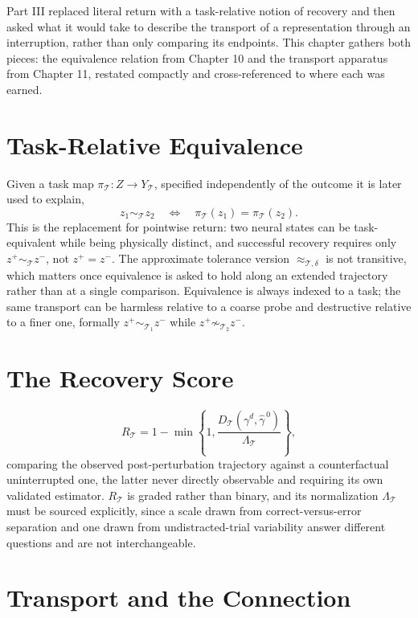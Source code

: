 \documentclass[11pt]{book}
\begin{document}
Part III replaced literal return with a task-relative notion of recovery and then asked what it would take to describe the transport of a representation through an interruption, rather than only comparing its endpoints. This chapter gathers both pieces: the equivalence relation from Chapter 10 and the transport apparatus from Chapter 11, restated compactly and cross-referenced to where each was earned.

\section*{Task-Relative Equivalence}

Given a task map $\pi_{\mathcal T}:Z\to Y_{\mathcal T}$, specified independently of the outcome it is later used to explain,
\[
z_1\sim_{\mathcal T}z_2
\quad\Longleftrightarrow\quad
\pi_{\mathcal T}(z_1)=\pi_{\mathcal T}(z_2).
\]
This is the replacement for pointwise return: two neural states can be task-equivalent while being physically distinct, and successful recovery requires only $z^{+}\sim_{\mathcal T}z^{-}$, not $z^{+}=z^{-}$. The approximate tolerance version $\approx_{\mathcal T,\delta}$ is not transitive, which matters once equivalence is asked to hold along an extended trajectory rather than at a single comparison. Equivalence is always indexed to a task; the same transport can be harmless relative to a coarse probe and destructive relative to a finer one, formally $z^{+}\sim_{\mathcal T_1}z^{-}$ while $z^{+}\not\sim_{\mathcal T_2}z^{-}$.

\section*{The Recovery Score}

\[
R_{\mathcal T}
=1-\min\left\{1,\frac{D_{\mathcal T}(\gamma^{d},\widehat\gamma^{\,0})}{\Lambda_{\mathcal T}}\right\},
\]
comparing the observed post-perturbation trajectory against a counterfactual uninterrupted one, the latter never directly observable and requiring its own validated estimator. $R_{\mathcal T}$ is graded rather than binary, and its normalization $\Lambda_{\mathcal T}$ must be sourced explicitly, since a scale drawn from correct-versus-error separation and one drawn from undistracted-trial variability answer different questions and are not interchangeable.

\section*{Transport and the Connection}
\end{document}
